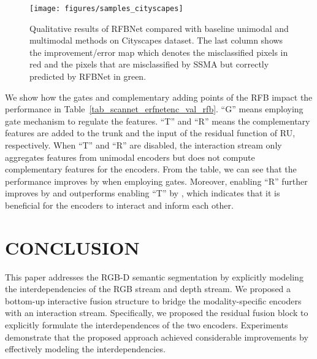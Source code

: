 \documentclass[letterpaper, 10 pt, conference]{ieeeconf}
\begin{document}
	\begin{figure*}[!htbp]
		\centering
		\texttt{[image: figures/samples\_cityscapes]}
		\caption{Qualitative results of RFBNet compared with baseline unimodal and multimodal methods on Cityscapes dataset. The last column shows the improvement/error map which denotes the misclassified pixels in red and the pixels that are misclassified by SSMA but correctly predicted by RFBNet in green.}
		\label{fig_samples_cityscapes}
	\end{figure*}
	
	We show how the gates and complementary adding points of the RFB impact the performance in Table~\ref{tab_scannet_erfnetenc_val_rfb}. ``G'' means employing gate mechanism to regulate the features. ``T'' and ``R'' means the complementary features are added to the trunk and the input of the residual function of RU, respectively. When ``T'' and ``R'' are disabled, the interaction stream only aggregates features from unimodal encoders but does not compute complementary features for the encoders. From the table, we can see that the performance improves by  when employing gates. Moreover, enabling ``R'' further improves by  and outperforms enabling ``T'' by , which indicates that it is beneficial for the encoders to interact and inform each other.

	\section{CONCLUSION}
	This paper addresses the RGB-D semantic segmentation by explicitly modeling the interdependencies of the RGB stream and depth stream. We proposed a bottom-up interactive fusion structure to bridge the modality-specific encoders with an interaction stream. Specifically, we proposed the residual fusion block to explicitly formulate the interdependences of the two encoders. Experiments demonstrate that the proposed approach achieved considerable improvements by effectively modeling the interdependencies.
	
	

	
	\newpage
	\clearpage
	
	

	
	
	
\end{document}
